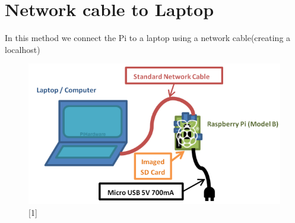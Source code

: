 \documentclass[11pt,a4paper]{article}
\begin{document}
		\section{Network cable to Laptop}
		In this method we connect the Pi to a laptop using a network cable(creating a localhost)
		\begin{figure}[h!]
			\includegraphics[scale=0.5]{nw.png}
			\centering
			\caption{[1]}
		\end{figure}
		
\end{document}
